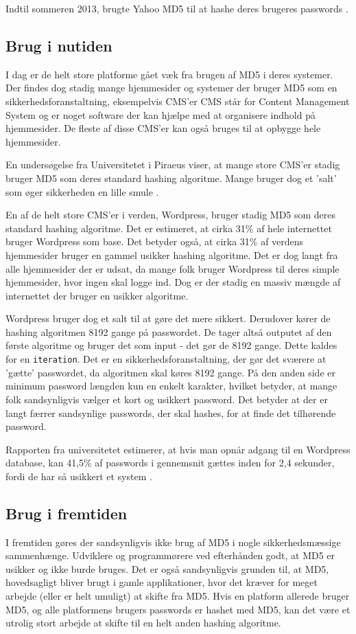 \documentclass[12pt]{article}
\begin{document}
Indtil sommeren 2013, brugte Yahoo MD5 til at hashe deres brugeres passwords \cite{noauthor_yahoo_nodate}.

\subsection{Brug i nutiden}
I dag er de helt store platforme gået væk fra brugen af MD5 i deres systemer. Der findes dog stadig mange hjemmesider og systemer der bruger MD5 som en sikkerhedsforanstaltning, eksempelvis CMS'er CMS står for Content Management System og er noget software der kan hjælpe med at organisere indhold på hjemmesider. De fleste af disse CMS'er kan også bruges til at opbygge hele hjemmesider. 

En undersøgelse fra Universitetet i Piraeus viser, at mange store CMS'er stadig bruger MD5 som deres standard hashing algoritme. Mange bruger dog et 'salt' som øger sikkerheden en lille smule \cite{ntantogian_evaluation_2019}.

En af de helt store CMS'er i verden, Wordpress, bruger stadig MD5 som deres standard hashing algoritme. Det er estimeret, at cirka 31\% af hele internettet bruger Wordpress som base. Det betyder også, at cirka 31\% af verdens hjemmesider bruger en gammel usikker hashing algoritme. Det er dog langt fra alle hjemmesider der er udsat, da mange folk bruger Wordpress til deres simple hjemmesider, hvor ingen skal logge ind. Dog er der stadig en massiv mængde af internettet der bruger en usikker algoritme. \cite{ntantogian_evaluation_2019}

Wordpress bruger dog et salt til at gøre det mere sikkert. Derudover kører de hashing algoritmen 8192 gange på passwordet. De tager altså outputet af den første algoritme og bruger det som input - det gør de 8192 gange. Dette kaldes for en \verb|iteration|. Det er en sikkerhedsforanstaltning, der gør det sværere at 'gætte' passwordet, da algoritmen skal køres 8192 gange. På den anden side er minimum password længden kun en enkelt karakter, hvilket betyder, at mange folk sandsynligvis vælger et kort og usikkert password. Det betyder at der er langt færrer sandsynlige passwords, der skal hashes, for at finde det tilhørende password.

Rapporten fra universitetet estimerer, at hvis man opnår adgang til en Wordpress database, kan 41,5\% af passwords i gennemsnit gættes inden for 2,4 sekunder, fordi de har så usikkert et system \cite{ntantogian_evaluation_2019}.

\subsection{Brug i fremtiden}
I fremtiden gøres der sandsynligvis ikke brug af MD5 i nogle sikkerhedsmæssige sammenhænge. Udviklere og programmørere ved efterhånden godt, at MD5 er usikker og ikke burde bruges. Det er også sandsynligvis grunden til, at MD5, hovedsagligt bliver brugt i gamle applikationer, hvor det kræver for meget arbejde (eller er helt umuligt) at skifte fra MD5. Hvis en platform allerede bruger MD5, og alle platformens brugers passwords er hashet med MD5, kan det være et utrolig stort arbejde at skifte til en helt anden hashing algoritme. 
\end{document}
